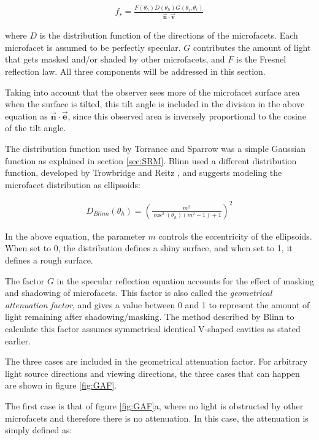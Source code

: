 	\begin{eqnarray*}
		f_r = \frac{F(\theta_h)D(\theta_h)G(\theta_i,\theta_r)}{\vec{\mathbf{n}} \cdot \vec{\mathbf{v}}}
	\end{eqnarray*}

\noindent where $D$ is the distribution function of the directions of the microfacets. Each microfacet is assumed to be perfectly specular. $G$ contributes the amount of light that gets masked and/or shaded by other microfacets, and $F$ is the Fresnel reflection law. All three components will be addressed in this section.

Taking into account that the observer sees more of the microfacet surface area when the surface is tilted, this tilt angle is included in the division in the above equation as $\vec{\mathbf{n}} \cdot \vec{\mathbf{e}}$, since this observed area is inversely proportional to the cosine of the tilt angle.

The distribution function used by Torrance and Sparrow was a simple Gaussian function as explained in section \ref{sec:SRM}. Blinn used a different distribution function, developed by Trowbridge and Reitz \cite{TrowbridgeReitz}, and suggests modeling the microfacet distribution as ellipsoids:

	\begin{eqnarray*}
		D_{Blinn}(\theta_h) = \left({ \frac{m^2}{\cos^2(\theta_h)(m^2-1)+1} } \right)^2
	\end{eqnarray*}

\noindent In the above equation, the parameter $m$ controls the eccentricity of the ellipsoids. When set to 0, the distribution defines a shiny surface, and when set to 1, it defines a rough surface.

The factor $G$ in the specular reflection equation accounts for the effect of masking and shadowing of microfacets. This factor is also called the \textit{geometrical attenuation factor}, and gives a value between 0 and 1 to represent the amount of light remaining after shadowing/masking. The method described by Blinn to calculate this factor assumes symmetrical identical V-shaped cavities as stated earlier. 

The three cases are included in the geometrical attenuation factor. For arbitrary light source directions and viewing directions, the three cases that can happen are shown in figure \ref{fig:GAF}.

The first case is that of figure \ref{fig:GAF}a, where no light is obstructed by other microfacets and therefore there is no attenuation. In this case, the attenuation is simply defined as:

